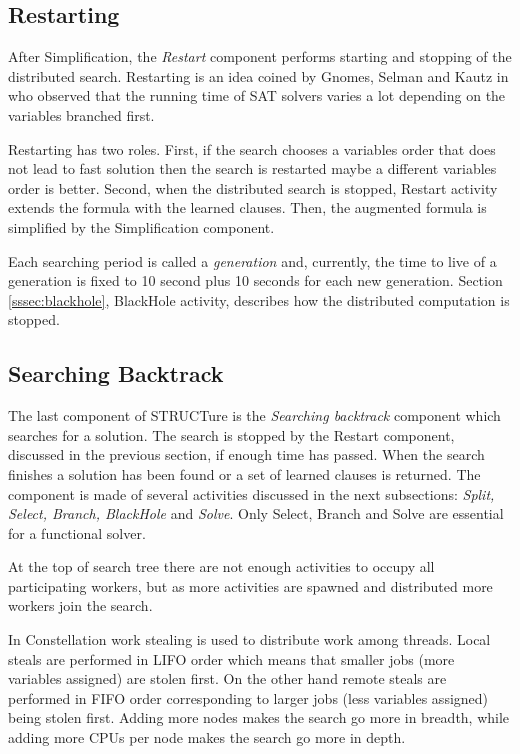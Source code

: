\subsection{Restarting}
\label{ssec:restarting}

After Simplification, the \emph{Restart}
component performs starting and stopping of the distributed
search. Restarting is an idea coined by Gnomes, Selman and Kautz
in \cite{Gomes:1998:BCS:295240.295710} who observed that the
running time of SAT solvers varies a lot depending on the variables
branched first.

Restarting has two roles. First, if the search chooses a variables
order that does not lead to fast solution then the search is
restarted maybe a different variables order is better.  Second,
when the distributed search is stopped, Restart activity extends
the formula with the learned clauses. Then, the augmented formula
is simplified by the Simplification component.

Each searching period is called a \emph{generation} and, currently,
the time to live of a generation is fixed to 10 second plus 10
seconds for each new generation.  Section \ref{sssec:blackhole},
BlackHole activity, describes how the distributed computation
is stopped.


\subsection{Searching Backtrack}
\label{ssec:searching-tree}

The last component of STRUCTure is the \emph{Searching backtrack}
component which searches for a solution. The search is stopped by the
Restart component, discussed in the previous section, if enough time
has passed. When the search finishes a solution has been found
or a set of learned clauses is returned. The component is made of
several activities discussed in the next subsections: \emph{Split,
Select, Branch, BlackHole} and \emph{Solve}. Only Select, Branch
and Solve are essential for a functional solver.

At the top of search tree there are not enough activities to occupy
all participating workers, but as more activities are spawned and
distributed more workers join the search.

In Constellation work stealing is used to distribute work among
threads.  Local steals are performed in LIFO order which means that
smaller jobs (more variables assigned) are stolen first.  On the
other hand remote steals are performed in FIFO order corresponding to
larger jobs (less variables assigned) being stolen first.  Adding more
nodes makes the search go more in breadth, while adding more CPUs
per node makes the search go more in depth.


